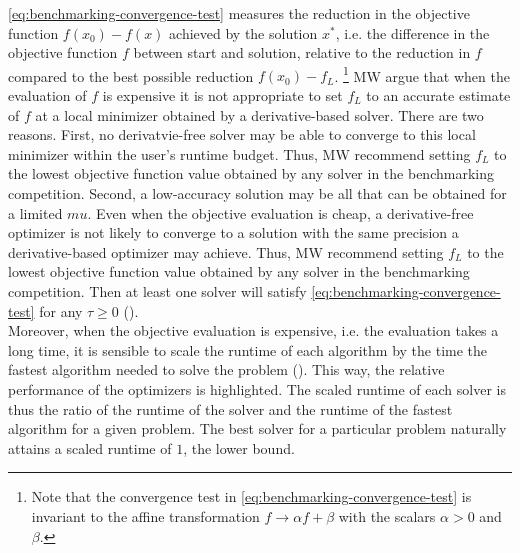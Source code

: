 \noindent \ref{eq:benchmarking-convergence-test} measures the reduction in the objective function $f(x_0) - f(x)$ achieved by the solution $x^*$, i.e. the difference in the objective function $f$ between start and solution, relative to the reduction in $f$ compared to the best possible reduction $f(x_0) - f_L$.
\footnote{Note that the convergence test in \ref{eq:benchmarking-convergence-test} is invariant to the affine transformation $f \rightarrow \alpha f + \beta$ with the scalars $\alpha > 0$ and $\beta$.}
MW argue that when the evaluation of $f$ is expensive it is not appropriate to set $f_L$ to an accurate estimate of $f$ at a local minimizer obtained by a derivative-based solver. There are two reasons.
First, no derivatvie-free solver may be able to converge to this local minimizer within the user's runtime budget. Thus, MW recommend setting $f_L$ to the lowest objective function value obtained by any solver in the benchmarking competition.
Second, a low-accuracy solution may be all that can be obtained for a limited $mu$. Even when the objective evaluation is cheap, a derivative-free optimizer is not likely to converge to a solution with the same precision a derivative-based optimizer may achieve.
Thus, MW recommend setting $f_L$ to the lowest objective function value obtained by any solver in the benchmarking competition.
Then at least one solver will satisfy \ref{eq:benchmarking-convergence-test} for any $\tau \geq 0$ (\cite{MoreWild2009}).\\
\noindent Moreover, when the objective evaluation is expensive, i.e. the evaluation takes a long time, it is sensible to scale the runtime of each algorithm by the time the fastest algorithm needed to solve the problem (\cite{MoreWild2009}). This way, the relative performance of the optimizers is highlighted. The scaled runtime of each solver is thus the ratio of the runtime of the solver and the runtime of the fastest algorithm for a given problem. The best solver for a particular problem naturally attains a scaled runtime of $1$, the lower bound.

